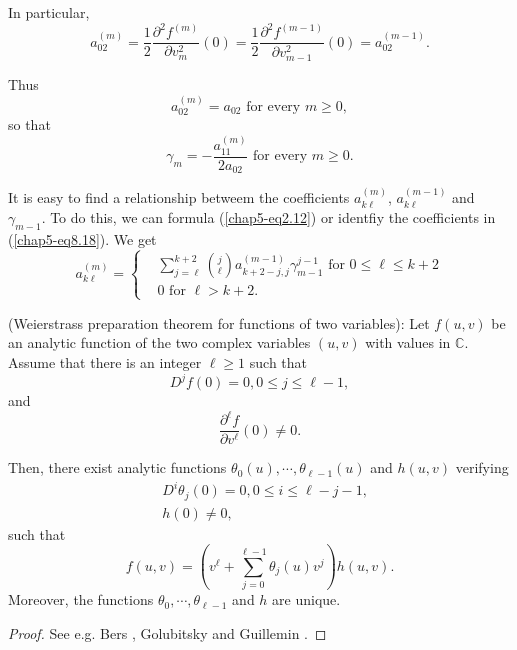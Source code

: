 In particular,
$$
a_{02}^{(m)} = \frac{1}{2} \frac{\partial^{2} f^{(m)}}{\partial
  v_{m}^{2}} (0) = \frac{1}{2} \frac{\partial^{2} f^{(m-1)}}{\partial
  v_{m-1}^{2}} (0) = a_{02}^{(m-1)}.
$$

Thus
$$
a_{02}^{(m)} = a_{02} \text{ for every } m \geq 0,
$$
so that
\begin{equation*}
\gamma_{m} = - \frac{a_{11}^{(m)}}{2a_{02}} \text{ for every } m \geq 0.\tag{8.19}\label{chap5-eq8.19}
\end{equation*}

It is easy to find a relationship betweem the coefficients
$a_{k\ell}^{(m)}$, $a_{k \ell}^{(m-1)}$ and $\gamma_{m-1}$. To do
this, we can formula (\ref{chap5-eq2.12}) or identfiy\pageoriginale
the coefficients in (\ref{chap5-eq8.18}). We get
\begin{equation*}
a_{k \ell}^{(m)} = 
\begin{cases}
& \sum\limits_{j=\ell}^{k+2} {j \choose \ell} a_{k+2-j, j}^{(m-1)}
\gamma_{m-1}^{j-1} \text{ for } 0 \leq \ell \leq k+2\\
& 0 \text{ for } \ell > k+2.
\end{cases}\tag{8.20}\label{chap5-eq8.20}
\end{equation*}

\begin{lemma}\label{chap5-lem8.2}
(Weierstrass preparation theorem for functions of two variables): Let
  $f(u, v)$ be an analytic function of the two complex variables $(u,
  v)$ with values in $\mathbb{C}$. Assume that there is an integer
  $\ell \geq 1$ such that
$$
D^{j}f(0) = 0, 0 \leq j \leq \ell-1,
$$
and
$$
\frac{\partial^{\ell} f}{\partial v^{\ell}}(0) \neq 0.
$$

Then, there exist analytic functions $\theta_{0}(u), \cdots,
\theta_{\ell-1}(u)$ and $h(u, v)$ verifying
\begin{align*}
& D^{i}\theta_{j}(0) = 0, 0 \leq i \leq \ell - j - 1,\\
& h(0) \neq 0,
\end{align*}
such that
$$
f(u, v) = (v^{\ell} + \sum\limits_{j=0}^{\ell - 1} \theta_{j}(u)
v^{j}) h(u, v).
$$
Moreover, the functions $\theta_{0}, \cdots, \theta_{\ell - 1}$ and $h$
are unique.

\end{lemma}

\begin{proof}
See e.g. Bers  \cite{3}, Golubitsky and Guillemin \cite{12}.
\end{proof}

